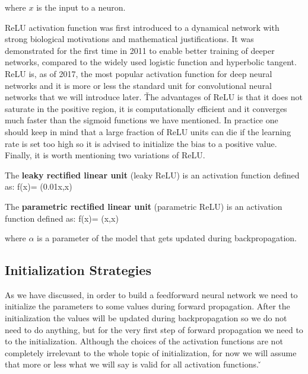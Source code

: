where $x$ is the input to a neuron.
\ed


ReLU activation function was first introduced to a dynamical network with strong biological motivations and 
mathematical justifications. It was demonstrated for the first time in 2011 to enable better training of deeper 
networks, compared to the widely used logistic function and hyperbolic tangent. ReLU is, as of 2017, the most popular
activation function for deep neural networks and it is more or less the standard unit for convolutional neural 
networks that we will introduce later. \v

The advantages of ReLU is that it does not saturate in the positive region, it is computationally efficient and it 
converges much faster than the sigmoid functions we have mentioned. In practice one should keep in mind that a large 
fraction of ReLU units can die if the learning rate is set too high so it is advised to initialize the bias to a 
positive value. Finally, it is worth mentioning two variations of ReLU\@.

The \textbf{leaky rectified linear unit }(leaky ReLU) is an activation function defined as:
\bse
f(x)= \max(0.01x,x)
\ese
\ed

The \textbf{parametric rectified linear unit }(parametric ReLU) is an activation function defined as:
\bse
f(x)= \max(\alpha x,x)
\ese

where $\alpha$ is a parameter of the model that gets updated during backpropagation.
\ed

\subsection{Initialization Strategies}

As we have discussed, in order to build a feedforward neural network we need to initialize the parameters to some 
values during forward propagation. After the initialization the values will be updated during backpropagation so we 
do not need to do anything, but for the very first step of forward propagation we need to to the initialization. 
Although the choices of the activation functions are not completely irrelevant to the whole topic of initialization, 
for now we will assume that more or less what we will say is valid for all activation functions. \v

